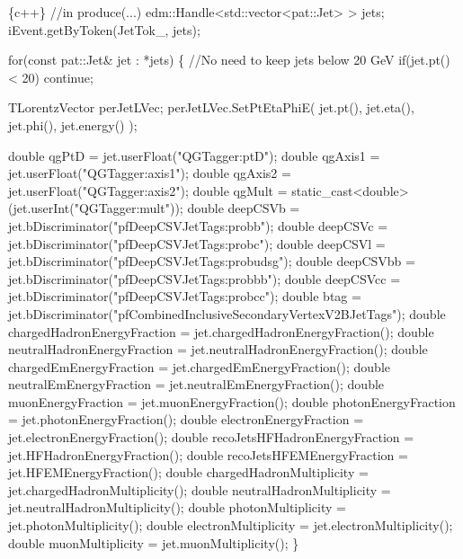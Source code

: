 \begin{DoxyCode}
\{c++\}
\textcolor{comment}{//in produce(...)}
edm::Handle<std::vector<pat::Jet> > jets;
iEvent.getByToken(JetTok\_, jets);

\textcolor{keywordflow}{for}(\textcolor{keyword}{const} pat::Jet& jet : *jets)
\{
    \textcolor{comment}{//No need to keep jets below 20 GeV}
    \textcolor{keywordflow}{if}(jet.pt() < 20) \textcolor{keywordflow}{continue};

    TLorentzVector perJetLVec;
    perJetLVec.SetPtEtaPhiE( jet.pt(), jet.eta(), jet.phi(), jet.energy() );

    \textcolor{keywordtype}{double} qgPtD = jet.userFloat(\textcolor{stringliteral}{"QGTagger:ptD"});
    \textcolor{keywordtype}{double} qgAxis1 = jet.userFloat(\textcolor{stringliteral}{"QGTagger:axis1"});
    \textcolor{keywordtype}{double} qgAxis2 = jet.userFloat(\textcolor{stringliteral}{"QGTagger:axis2"});
    \textcolor{keywordtype}{double} qgMult = \textcolor{keyword}{static\_cast<}\textcolor{keywordtype}{double}\textcolor{keyword}{>}(jet.userInt(\textcolor{stringliteral}{"QGTagger:mult"}));
    \textcolor{keywordtype}{double} deepCSVb = jet.bDiscriminator(\textcolor{stringliteral}{"pfDeepCSVJetTags:probb"});
    \textcolor{keywordtype}{double} deepCSVc = jet.bDiscriminator(\textcolor{stringliteral}{"pfDeepCSVJetTags:probc"});
    \textcolor{keywordtype}{double} deepCSVl = jet.bDiscriminator(\textcolor{stringliteral}{"pfDeepCSVJetTags:probudsg"});
    \textcolor{keywordtype}{double} deepCSVbb = jet.bDiscriminator(\textcolor{stringliteral}{"pfDeepCSVJetTags:probbb"});
    \textcolor{keywordtype}{double} deepCSVcc = jet.bDiscriminator(\textcolor{stringliteral}{"pfDeepCSVJetTags:probcc"});
    \textcolor{keywordtype}{double} btag = jet.bDiscriminator(\textcolor{stringliteral}{"pfCombinedInclusiveSecondaryVertexV2BJetTags"});
    \textcolor{keywordtype}{double} chargedHadronEnergyFraction = jet.chargedHadronEnergyFraction();
    \textcolor{keywordtype}{double} neutralHadronEnergyFraction = jet.neutralHadronEnergyFraction();
    \textcolor{keywordtype}{double} chargedEmEnergyFraction = jet.chargedEmEnergyFraction();
    \textcolor{keywordtype}{double} neutralEmEnergyFraction = jet.neutralEmEnergyFraction();
    \textcolor{keywordtype}{double} muonEnergyFraction = jet.muonEnergyFraction();
    \textcolor{keywordtype}{double} photonEnergyFraction = jet.photonEnergyFraction();
    \textcolor{keywordtype}{double} electronEnergyFraction = jet.electronEnergyFraction();
    \textcolor{keywordtype}{double} recoJetsHFHadronEnergyFraction = jet.HFHadronEnergyFraction();
    \textcolor{keywordtype}{double} recoJetsHFEMEnergyFraction = jet.HFEMEnergyFraction();
    \textcolor{keywordtype}{double} chargedHadronMultiplicity = jet.chargedHadronMultiplicity();
    \textcolor{keywordtype}{double} neutralHadronMultiplicity = jet.neutralHadronMultiplicity();
    \textcolor{keywordtype}{double} photonMultiplicity = jet.photonMultiplicity();
    \textcolor{keywordtype}{double} electronMultiplicity = jet.electronMultiplicity();
    \textcolor{keywordtype}{double} muonMultiplicity = jet.muonMultiplicity();
\}
\end{DoxyCode}


